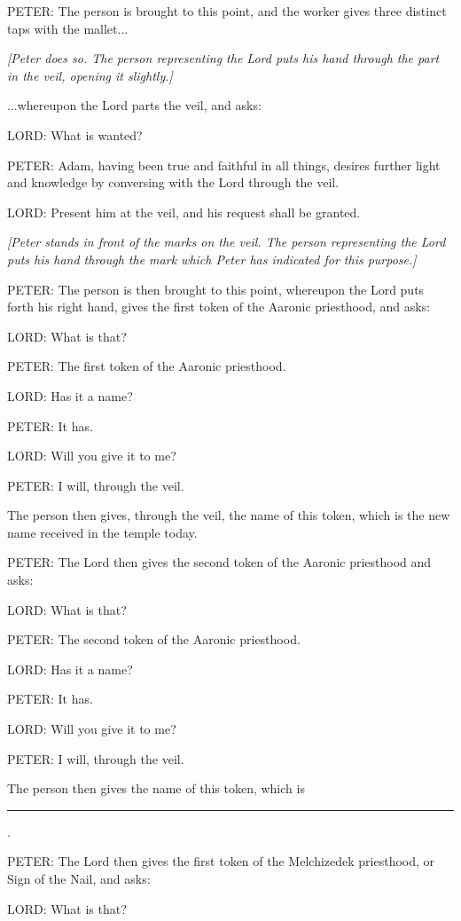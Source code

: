 			PETER: The person is brought to this point, and the worker gives three distinct taps with the mallet...

			\textit{[Peter does so. The person representing the Lord puts his hand through the part in the veil, opening it slightly.]}

			...whereupon the Lord parts the veil, and asks:

			LORD: What is wanted?

			PETER: Adam, having been true and faithful in all things, desires further light and knowledge by conversing with the Lord through the veil.

			LORD: Present him at the veil, and his request shall be granted.

			\textit{[Peter stands in front of the marks on the veil. The person representing the Lord puts his hand through the mark which Peter has indicated for this purpose.]}

			PETER: The person is then brought to this point, whereupon the Lord puts forth his right hand, gives the first token of the Aaronic priesthood, and asks:

			LORD: What is that?

			PETER: The first token of the Aaronic priesthood.

			LORD: Has it a name?

			PETER: It has.

			LORD: Will you give it to me?

			PETER: I will, through the veil.

			The person then gives, through the veil, the name of this token, which is the new name received in the temple today.

			PETER: The Lord then gives the second token of the Aaronic priesthood and asks:

			LORD: What is that?

			PETER: The second token of the Aaronic priesthood.

			LORD: Has it a name?

			PETER: It has.

			LORD: Will you give it to me?

			PETER: I will, through the veil.

			The person then gives the name of this token, which is \rule{1cm}{0.15mm}.

			PETER: The Lord then gives the first token of the Melchizedek priesthood, or Sign of the Nail, and asks:

			LORD: What is that?

